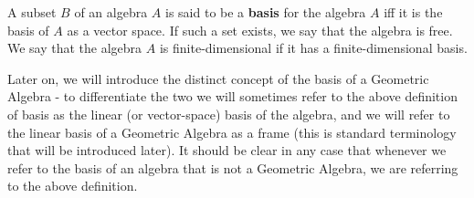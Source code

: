 \begin{definition}[Basis]\label{d:algebra-basis}
	A subset $B$ of an algebra $A$ is said to be a \textbf{basis} for the algebra $A$ iff it is the basis of $A$ as a vector space.
	If such a set exists, we say that the algebra is free. We say that the algebra $A$ is finite-dimensional if it has a finite-dimensional basis. 
\end{definition}
\begin{remark}
	Later on, we will introduce the distinct concept of the basis of a Geometric Algebra - to differentiate the two we will sometimes refer to the above definition of basis as the linear (or vector-space) basis of the algebra, and we will refer to the linear basis of a Geometric Algebra as a frame (this is standard terminology that will be introduced later). It should be clear in any case that whenever we refer to the basis of an algebra that is not a Geometric Algebra, we are referring to the above definition.
\end{remark}
